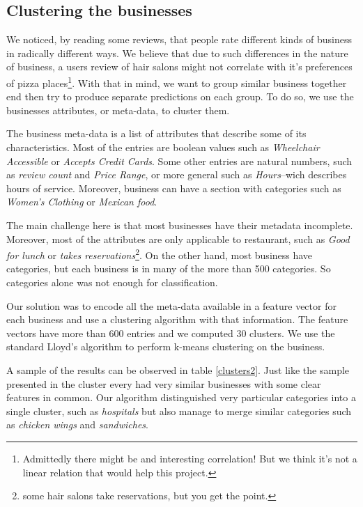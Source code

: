 \documentclass[12pt]{article}
\begin{document}
\begin{multicols}{2}
\section{Clustering the businesses}
We noticed, by reading some reviews, that people rate different kinds of business in radically different ways. %
We believe that due to such differences in the nature of business, a users review of hair salons might not correlate with it's preferences of pizza places\footnote{Admittedly there might be and interesting correlation! But we think it's not a linear relation that would help this project.}.
With that in mind, we want to group similar business together end then try to produce separate predictions on each group. To do so, we use the businesses attributes, or meta-data, to cluster them.

The business meta-data is a list of attributes that describe some of its characteristics. Most of the entries are boolean values such as \emph{Wheelchair Accessible} or \emph{Accepts Credit Cards}. Some other entries are natural numbers, such as \emph{review count} and \emph{Price Range}, or more general such as \emph{Hours}--wich describes hours of service. Moreover, business can have a section with categories such as \emph{Women's Clothing} or \emph{Mexican food}.

The main challenge here is that most businesses have their metadata incomplete. Moreover, most of the attributes are only applicable to restaurant, such as \emph{Good for lunch} or \emph{takes reservations}\footnote{some hair salons take reservations, but you get the point.}. On the other hand, most business have categories, but each business is in many of the more than 500 categories. So categories alone was not enough for classification. 

Our solution was to encode all the meta-data available in a feature vector for each business and use a clustering algorithm with that information. The feature vectors have more than 600 entries and we computed 30 clusters. We use the standard Lloyd's algorithm to perform k-means clustering on the business.  

A sample of the results can be observed in table \ref{clusters2}. Just like the sample presented in the cluster every had very similar businesses with some clear features in common. Our algorithm distinguished very particular categories into a single cluster, such as \emph{hospitals} but also manage to merge similar categories such as \emph{chicken wings} and \emph{sandwiches}.



\end{multicols}
\end{document}
